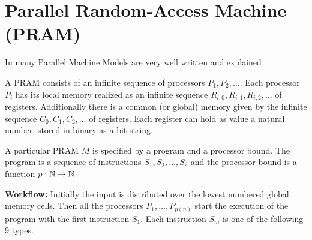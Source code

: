 \section{Parallel Random-Access Machine (\textsc{PRAM})}
In \cite{RichardM.RAMACHANDRAN_1990} many Parallel Machine Models are very well written and explained
\begin{definition}
	A \textsc{PRAM} consists of an infinite sequence of processors $P_1,P_2,\dots$. Each processor $P_i$ has its local memory realized as an infinite sequence $R_{i,0},R_{i,1},R_{i,2},\dots$ of registers. Additionally there is a common (or global) memory given by the infinite sequence $C_0,C_1,C_2,\dots$ of registers. Each register can hold as value a natural number, stored in binary as a bit string.
	
	A particular \textsc{PRAM} $M$ is specified by a program and a processor bound. The program is a sequence of instructions $S_1,S_2,\dots, S_s$ and the processor bound is a function $p:\mathbb{N}\to \mathbb{N}$
	
	\textbf{Workflow:} Initially the input is distributed over the lowest numbered global memory cells. Then all the processors $P_1,\dots,P_{p(n)}$ start the execution of the program with the first instruction $S_1$. Each instruction $S_m$ is one of the following 9 types. 
	

\end{definition}

